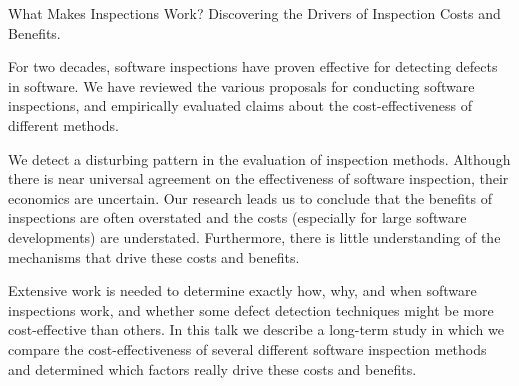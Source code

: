 What Makes Inspections Work? Discovering the Drivers of Inspection
Costs and Benefits. 

For two decades, software inspections have proven effective for detecting
defects in software. We have reviewed the various proposals 
for conducting software inspections, and empirically evaluated claims 
about the cost-effectiveness of different methods. 

We detect a disturbing pattern in the evaluation of inspection methods. 
Although there is near universal agreement on the effectiveness of software 
inspection, their economics are uncertain. Our research leads us to conclude that
the benefits of inspections are often overstated and the costs (especially
for large software developments) are understated. Furthermore, 
there is little understanding of the mechanisms that drive these costs
and benefits.

Extensive work is needed to determine exactly how, why, and when software 
inspections work, and whether some defect detection techniques might
be more cost-effective than others. In this talk we describe a long-term
study in which we compare the cost-effectiveness of several different 
software inspection methods and determined which factors really drive these
costs and benefits.
